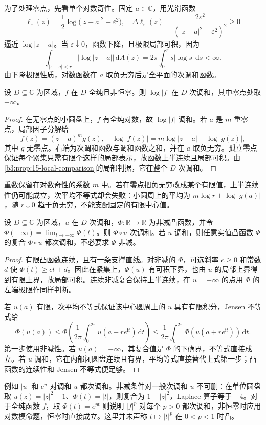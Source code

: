 为了处理零点，先看单个对数奇性。固定 \(a\in\mathbb C\)，用光滑函数
\[
 \ell_\varepsilon(z)=\frac12\log\bigl(|z-a|^2+\varepsilon^2\bigr),
 \quad
 \Delta\ell_\varepsilon(z)=\frac{2\varepsilon^2}{(|z-a|^2+\varepsilon^2)^2}\ge0
\]
逼近 \(\log|z-a|\)。当 \(\varepsilon\downarrow0\)，函数下降，且极限局部可积，因为
\[
 \int_{|z-a|<r}|\log|z-a||\,\mathrm{d}A(z)
 =2\pi\int_0^r s|\log s|\,\mathrm{d}s<\infty.
\]
由下降极限性质，对数函数在 \(a\) 取负无穷后是全平面的次调和函数。

\begin{proposition}\label{b3:prop:15-log-subharmonic}
设 \(D\subseteq\mathbb C\) 为区域，\(f\) 在 \(D\) 全纯且非恒零。则 \(\log|f|\) 在 \(D\) 次调和，其中零点处取 \(-\infty\)。
\end{proposition}
\begin{proof}
在无零点的小圆盘上，\(f\) 有全纯对数，故 \(\log|f|\) 调和。若 \(a\) 是 \(m\) 重零点，局部因子分解给
\[
 f(z)=(z-a)^m g(z),
 \quad
 \log|f(z)|=m\log|z-a|+\log|g(z)|,
\]
其中 \(g\) 无零点。右端为次调和函数与调和函数之和，并在 \(a\) 取负无穷。孤立零点保证每个紧集只需有限个这样的局部表示，故函数上半连续且局部可积。由\cref{b3:prop:15-local-comparison}的局部判据，它在整个 \(D\) 次调和。
\end{proof}
重数保留在对数奇性的系数 \(m\) 中。若在零点把负无穷改成某个有限值，上半连续性仍可能成立，次平均不等式却会失败：小圆周上的平均为 \(m\log r+\log|g(a)|\)，随 \(r\downarrow0\) 趋于负无穷，不能支配固定的有限中心值。

\begin{proposition}[凸复合]\label{b3:prop:15-convex-composition}
设 \(D\subseteq\mathbb C\) 为区域，\(u\) 在 \(D\) 次调和，\(\Phi:\mathbb R\to\mathbb R\) 为非减凸函数，并令 \(\Phi(-\infty)=\lim_{t\to-\infty}\Phi(t)\)。则 \(\Phi\circ u\) 次调和。若 \(u\) 调和，则任意实值凸函数 \(\Phi\) 的复合 \(\Phi\circ u\) 都次调和，不必要求 \(\Phi\) 非减。
\end{proposition}
\begin{proof}
有限凸函数连续，且有一条支撑直线。对非减的 \(\Phi\)，可选斜率 \(c\ge0\) 和常数 \(d\) 使 \(\Phi(t)\ge ct+d\)。因此在紧集上，\(\Phi(u)\) 有可积下界，也由 \(u\) 的局部上界得到有限上界，故局部可积。连续非减复合保持上半连续，在 \(u=-\infty\) 的点用 \(\Phi\) 的左端极限作同样判断。

若 \(u(a)\) 有限，次平均不等式保证该中心圆周上的 \(u\) 具有有限积分，Jensen 不等式给
\[
 \Phi(u(a))\le
 \Phi\left(\frac1{2\pi}\int_0^{2\pi}u(a+re^{\mathrm{i}t})\,\mathrm{d}t\right)
 \le\frac1{2\pi}\int_0^{2\pi}\Phi(u(a+re^{\mathrm{i}t}))\,\mathrm{d}t.
\]
第一步使用非减性。若 \(u(a)=-\infty\)，其复合值是 \(\Phi\) 的下确界，不等式直接成立。若 \(u\) 调和，它在内部闭圆盘连续且有界，平均等式直接替代上式第一步；凸函数的连续性和 Jensen 不等式便足够。
\end{proof}
例如 \(|u|\) 和 \(e^u\) 对调和 \(u\) 都次调和。非减条件对一般次调和 \(u\) 不可删：在单位圆盘取 \(u(z)=|z|^2-1\)、\(\Phi(t)=|t|\)，则复合为 \(1-|z|^2\)，Laplace 算子等于 \(-4\)。对于全纯函数 \(f\)，取 \(\Phi(t)=e^{pt}\) 则说明 \(|f|^p\) 对每个 \(p>0\) 都次调和，非恒零时应用对数模命题，恒零时直接成立。这里并未声称 \(t\mapsto|t|^p\) 在 \(0<p<1\) 时凸。

